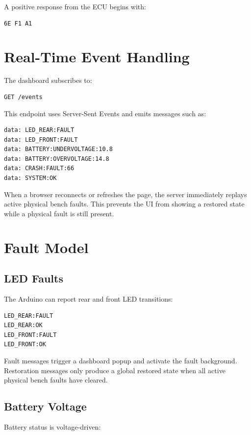 \documentclass[a4paper,10pt,titlepage,oneside]{article}
\begin{document}
A positive response from the ECU begins with:

\begin{lstlisting}
6E F1 A1
\end{lstlisting}

\section{Real-Time Event Handling}

The dashboard subscribes to:

\begin{lstlisting}
GET /events
\end{lstlisting}

This endpoint uses Server-Sent Events and emits messages such as:

\begin{lstlisting}
data: LED_REAR:FAULT
data: LED_FRONT:FAULT
data: BATTERY:UNDERVOLTAGE:10.8
data: BATTERY:OVERVOLTAGE:14.8
data: CRASH:FAULT:66
data: SYSTEM:OK
\end{lstlisting}

When a browser reconnects or refreshes the page, the server immediately replays
active physical bench faults. This prevents the UI from showing a restored state
while a physical fault is still present.

\section{Fault Model}

\subsection{LED Faults}

The Arduino can report rear and front LED transitions:

\begin{lstlisting}
LED_REAR:FAULT
LED_REAR:OK
LED_FRONT:FAULT
LED_FRONT:OK
\end{lstlisting}

Fault messages trigger a dashboard popup and activate the fault background.
Restoration messages only produce a global restored state when all active
physical bench faults have cleared.

\subsection{Battery Voltage}

Battery status is voltage-driven:
\end{document}
